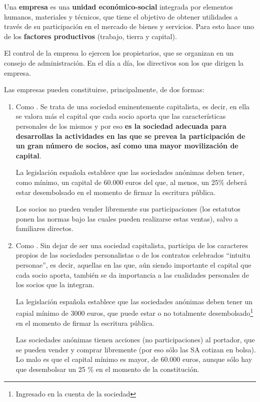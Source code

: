\documentclass[nochap,palatino,shortheader]{apuntes}
\begin{document}
\begin{defn}[Empresa]
Una \textbf{empresa} es una \textbf{unidad económico-social} integrada por elementos humanos, materiales y técnicos, que tiene el objetivo de obtener utilidades a través de su participación en el mercado de bienes y servicios. Para esto hace uno de los \textbf{factores productivos} (trabajo, tierra y capital).

El control de la empresa lo ejercen los propietarios, que se organizan en un consejo de administración. En el día a día, los directivos son los que dirigen la empresa.

\end{defn}
\newpage
Las empresas pueden constituirse, principalmente, de dos formas:
\begin{enumerate}
\item Como . Se trata de una sociedad eminentemente capitalista, es decir, en ella se valora más el capital que cada socio aporta que las características personales de los mismos y por eso \textbf{es la sociedad adecuada para desarrollas la actividades en las que se prevea la participación de un gran número de socios, así como una mayor movilización de capital}.

La legislación española establece que las sociedades anónimas deben tener, como mínimo, un capital de 60.000 euros del que, al menos, un 25\% deberá estar desembolsado en el momento de firmar la escritura pública.

Los socios no pueden vender libremente sus participaciones (los estatutos ponen las normas bajo las cuales pueden realizarse estas ventas), salvo a familiares directos.

\item Como  . Sin dejar de ser una sociedad capitalista, participa de los caracteres propios de las sociedades personalistas o de los contratos celebrados ``intuitu personae'', es decir, aquellas en las que, aún siendo importante el capital que cada socio aporta, también se da importancia a las cualidades personales de los socios que la integran.

La legislación española establece que las sociedades anónimas deben tener un capial mínimo de 3000 euros, que puede estar o no totalmente desembolsado\footnote{Ingresado en la cuenta de la sociedad} en el momento de firmar la escritura pública.

Las sociedades anónimas tienen acciones (no participaciones) al portador, que se pueden vender y comprar libremente (por eso sólo las SA cotizan en bolsa). Lo malo es que el capital mínimo es mayor, de 60.000 euros, aunque sólo hay que desembolsar un 25 \% en el momento de la constitución.
\end{enumerate}
\end{document}
